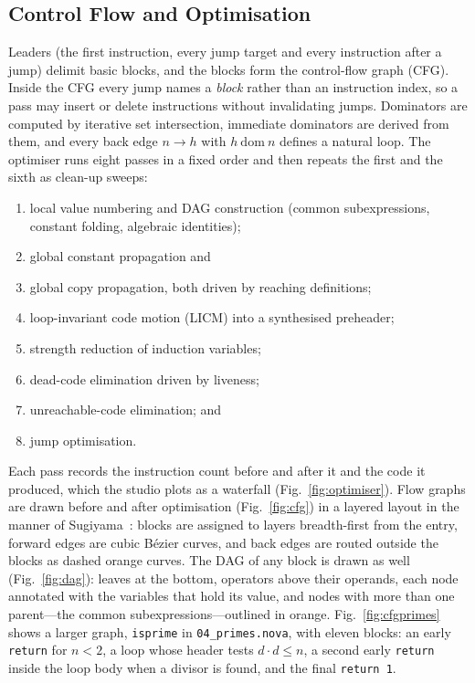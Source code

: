 \documentclass[conference]{IEEEtran}
\newcommand{\code}[1]{\texttt{#1}}
\begin{document}
\subsection{Control Flow and Optimisation}
Leaders (the first instruction, every jump target and every instruction after a jump) delimit basic blocks, and the blocks form the control-flow graph (CFG). Inside the CFG every jump names a \emph{block} rather than an instruction index, so a pass may insert or delete instructions without invalidating jumps. Dominators are computed by iterative set intersection, immediate dominators are derived from them, and every back edge $n \to h$ with $h~\mathrm{dom}~n$ defines a natural loop. The optimiser runs eight passes in a fixed order and then repeats the first and the sixth as clean-up sweeps:
\begin{enumerate}
\item local value numbering and DAG construction (common subexpressions, constant folding, algebraic identities);
\item global constant propagation and
\item global copy propagation, both driven by reaching definitions;
\item loop-invariant code motion (LICM) into a synthesised preheader;
\item strength reduction of induction variables;
\item dead-code elimination driven by liveness;
\item unreachable-code elimination; and
\item jump optimisation.
\end{enumerate}
Each pass records the instruction count before and after it and the code it produced, which the studio plots as a waterfall (Fig.~\ref{fig:optimiser}). Flow graphs are drawn before and after optimisation (Fig.~\ref{fig:cfg}) in a layered layout in the manner of Sugiyama~\cite{sugiyama1981}: blocks are assigned to layers breadth-first from the entry, forward edges are cubic B\'ezier curves, and back edges are routed outside the blocks as dashed orange curves. The DAG of any block is drawn as well (Fig.~\ref{fig:dag}): leaves at the bottom, operators above their operands, each node annotated with the variables that hold its value, and nodes with more than one parent---the common subexpressions---outlined in orange. Fig.~\ref{fig:cfgprimes} shows a larger graph, \code{isprime} in \code{04\_primes.nova}, with eleven blocks: an early \code{return} for $n<2$, a loop whose header tests $d \cdot d \le n$, a second early \code{return} inside the loop body when a divisor is found, and the final \code{return 1}.
\end{document}
